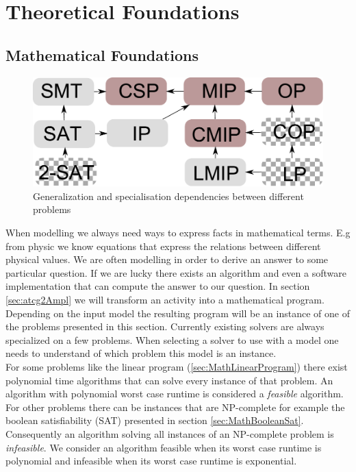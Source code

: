 \chapter{Theoretical Foundations}
\label{chap:preliminaries}
\section{Mathematical Foundations}
\label{sec:Maths}
\begin{figure}
\label{fig:problemLatice}
\includegraphics[width=\textwidth]{./pics/ProblemLatice.pdf}
\caption{Generalization and specialisation dependencies between different problems}
\end{figure}
When modelling we always need ways to express facts in mathematical terms. E.g from physic we know equations that express the relations between different physical values. We are often modelling in order to derive an answer to some particular question. If we are lucky there exists an algorithm and even a software implementation that can compute the answer to our question. In section \ref{sec:atcg2Ampl} we will transform an activity into a mathematical program. Depending on the input model the resulting program will be an instance of one of the problems presented in this section. Currently existing solvers are always specialized on a few problems. When selecting a solver to use with a model one needs to understand of which problem this model is an instance.\\
For some problems like the linear program (\ref{sec:MathLinearProgram}) there exist polynomial time algorithms that can solve every instance of that problem. An algorithm with polynomial worst case runtime is considered a \emph{feasible} algorithm. For other problems there can be instances that are NP-complete for example the boolean satisfiability (SAT) presented in section \ref{sec:MathBooleanSat}. Consequently an algorithm solving all instances of an NP-complete problem is \emph{infeasible}. We consider an algorithm feasible when its worst case runtime is polynomial and infeasible when its worst case runtime is exponential.\\

